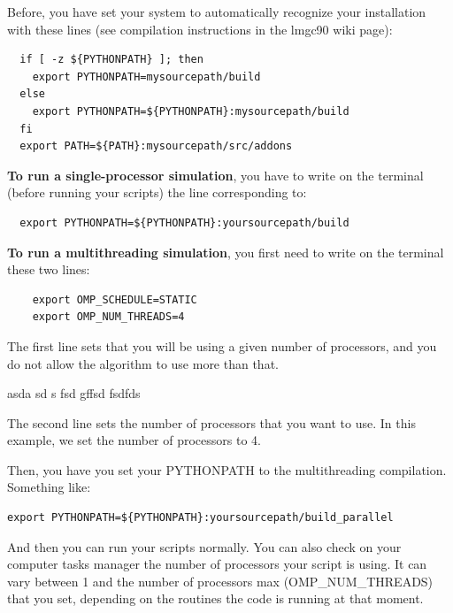\documentclass[12pt]{article}
\begin{document}
Before, you have set your system to automatically recognize your installation with these lines (see compilation instructions in the lmgc90 wiki page): 

\begin{tcolorbox}[colback=blue!10]
\begin{verbatim}
  if [ -z ${PYTHONPATH} ]; then
    export PYTHONPATH=mysourcepath/build
  else
    export PYTHONPATH=${PYTHONPATH}:mysourcepath/build
  fi
  export PATH=${PATH}:mysourcepath/src/addons
\end{verbatim}
\end{tcolorbox}

\textbf{To run a single-processor simulation}, you have to write on the terminal (before running your scripts) the line corresponding to: 

\begin{tcolorbox}
\begin{verbatim}
  export PYTHONPATH=${PYTHONPATH}:yoursourcepath/build
\end{verbatim}
\end{tcolorbox}

\textbf{To run a multithreading simulation}, you first need to write on the terminal these two lines:

\begin{tcolorbox}
  \begin{verbatim}
    export OMP_SCHEDULE=STATIC
    export OMP_NUM_THREADS=4
\end{verbatim}
\end{tcolorbox}

The first line sets that you will be using a given number of processors, and you do not allow the algorithm to use more than that. 

asda sd s fsd gffsd fsdfds

The second line sets the number of processors that you want to use. 
In this example, we set the number of processors to 4. 

Then, you have you set your PYTHONPATH to the multithreading compilation. Something like: 

\small
\begin{tcolorbox}
\begin{verbatim}
export PYTHONPATH=${PYTHONPATH}:yoursourcepath/build_parallel
\end{verbatim}
\end{tcolorbox}
\normalsize

And then you can run your scripts normally. 
You can also check on your computer tasks manager the number of processors your script is using. 
It can vary between 1 and the number of processors max (OMP\_NUM\_THREADS) that you set, depending on the routines the code is running at that moment. 
\end{document}
